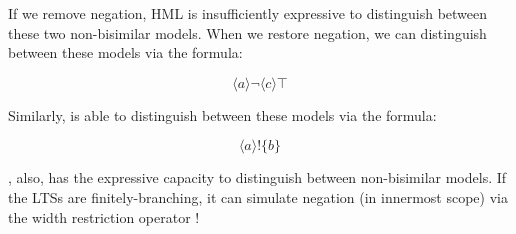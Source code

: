 If we remove negation, HML is insufficiently expressive to distinguish
between these two non-bisimilar models.  When we restore negation, we
can distinguish between these models via the formula:

\[
   \langle a \rangle \neg \langle c \rangle \top
\]

\NI Similarly, \ELABR{} is able to distinguish between these models via the
formula:

\[
  \langle a \rangle ! \{b\}
\]

\NI \ELABR{}, also, has the expressive capacity to distinguish between
non-bisimilar models. If the LTSs are finitely-branching, it can
simulate negation (in innermost scope) via the width restriction
operator !
